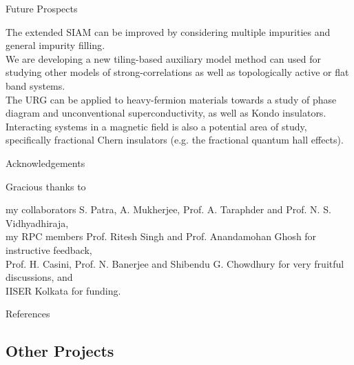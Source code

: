 \documentclass[8pt,aspectratio=169]{beamer}
\begin{document}
\begin{frame}{Future Prospects}
\begin{itemize}
	\nitem The extended SIAM can be improved by considering \alert{multiple impurities} and general impurity \alert{filling}.\\[20pt]
	\nitem We are developing a new \alert{tiling-based auxiliary model method} can used for studying other models of strong-correlations as well as topologically active or flat band systems.\\[20pt]
	\nitem The URG can be applied to \alert{heavy-fermion materials} towards a study of phase diagram and unconventional superconductivity, as well as Kondo insulators.\\[20pt]
	\nitem Interacting systems in a magnetic field is also a potential area of study, specifically \alert{fractional Chern insulators} (e.g. the fractional quantum hall effects).
\end{itemize}
\end{frame}


\begin{frame}{Acknowledgements}

\flushleft
Gracious thanks to\\[10pt]
\begin{itemize}
	\nitem my collaborators \alert{S. Patra, A. Mukherjee, Prof. A. Taraphder} and \alert{Prof. N. S. Vidhyadhiraja},\\[10pt]
	\nitem my RPC members \alert{Prof. Ritesh Singh} and \alert{Prof. Anandamohan Ghosh} for instructive feedback,\\[10pt]
	\nitem \alert{Prof. H. Casini, Prof. N. Banerjee} and \alert{Shibendu G. Chowdhury} for very fruitful discussions, and\\[10pt]
	\nitem IISER Kolkata for funding.
\end{itemize}

\end{frame}

\appendix

\begin{frame}[allowframebreaks]{References}
\printbibliography[heading=none]
\end{frame}

\begin{frame}{}
\section{Other Projects}
\end{frame}
\end{document}
